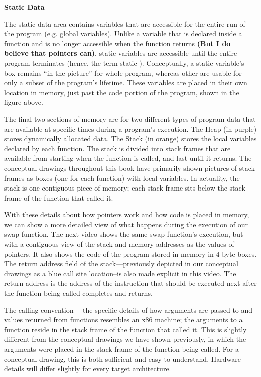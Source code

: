 \documentclass[11pt, a4paper]{article}
\begin{document}
\textbf{Static Data}

The static data area contains variables that are accessible for the entire run of the program (e.g. global variables). Unlike a variable that is declared inside a function and is no longer accessible when the function returns \textbf{(But I do believe that pointers can)}, static variables are accessible until the entire program terminates (hence, the term static ). Conceptually, a static variable’s box remains “in the picture” for whole program, whereas other are usable for only a subset of the program’s lifetime. These variables are placed in their own location in memory, just past the code portion of the program, shown in the figure above.

The final two sections of memory are for two different types of program data that are available at specific times during a program’s execution. The Heap (in purple) stores dynamically allocated data. The Stack (in orange) stores the local variables declared by each function. The stack is divided into stack frames that are available from starting when the function is called, and last until it returns. The conceptual drawings throughout this book have primarily shown pictures of stack frames as boxes (one for each function) with local variables. In actuality, the stack is one contiguous piece of memory; each stack frame sits below the stack frame of the function that called it.

With these details about how pointers work and how code is placed in memory, we can show a more detailed view of what happens during the execution of our swap function. The next video shows the same swap function’s execution, but with a contiguous view of the stack and memory addresses as the values of pointers. It also shows the code of the program stored in memory in 4-byte boxes. The return address field of the stack—previously depicted in our conceptual drawings as a blue call site location–is also made explicit in this video. The return address is the address of the instruction that should be executed next after the function being called completes and returns.

The calling convention —the specific details of how arguments are passed to and values returned from functions resembles an x86 machine; the arguments to a function reside in the stack frame of the function that called it. This is slightly different from the conceptual drawings we have shown previously, in which the arguments were placed in the stack frame of the function being called. For a conceptual drawing, this is both sufficient and easy to understand. Hardware details will differ slightly for every target architecture.
\end{document}
